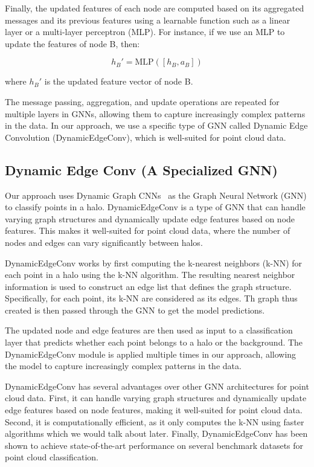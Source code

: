     Finally, the updated features of each node are computed based on its aggregated messages and its previous features using a learnable function such as a linear layer or a multi-layer perceptron (MLP). For instance, if we use an MLP to update the features of node B, then:

    
    \begin{equation}
        h_B' = \mathrm{MLP}([h_B, a_B])
        \label{eq:update}
    \end{equation}
    
    where $h_B'$ is the updated feature vector of node B.
    
    The message passing, aggregation, and update operations are repeated for multiple layers in GNNs, allowing them to capture increasingly complex patterns in the data. In our approach, we use a specific type of GNN called Dynamic Edge Convolution (DynamicEdgeConv), which is well-suited for point cloud data.

\subsection{Dynamic Edge Conv (A Specialized GNN)}\label{ssec:DEC}
    
    Our approach uses Dynamic Graph CNNs~\cite{DynamicEdgeConv} as the Graph Neural Network (GNN) to classify points in a halo. DynamicEdgeConv is a type of GNN that can handle varying graph structures and dynamically update edge features based on node features. This makes it well-suited for point cloud data, where the number of nodes and edges can vary significantly between halos.
    
    DynamicEdgeConv works by first computing the k-nearest neighbors (k-NN) for each point in a halo using the k-NN algorithm. The resulting nearest neighbor information is used to construct an edge list that defines the graph structure. Specifically, for each point, its k-NN are considered as its edges. Th graph thus created is then passed through the GNN to get the model predictions.
    
    The updated node and edge features are then used as input to a classification layer that predicts whether each point belongs to a halo or the background. The DynamicEdgeConv module is applied multiple times in our approach, allowing the model to capture increasingly complex patterns in the data.
    
    DynamicEdgeConv has several advantages over other GNN architectures for point cloud data. First, it can handle varying graph structures and dynamically update edge features based on node features, making it well-suited for point cloud data. Second, it is computationally efficient, as it only computes the k-NN using faster algorithms which we would talk about later. Finally, DynamicEdgeConv has been shown to achieve state-of-the-art performance on several benchmark datasets for point cloud classification.

